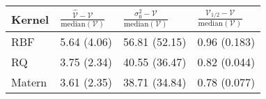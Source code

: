 \begin{tabular}{llll}
  \toprule
Kernel & $\frac{\hat{\mathcal{V}} - \mathcal{V}}{\mathrm{median}(\mathcal{V})}$ & $\frac{\sigma_0^2 - \mathcal{V}}{\mathrm{median}(\mathcal{V})}$ & $\frac{\mathcal{V}_{1/2} - \mathcal{V}}{\mathrm{median}(\mathcal{V})}$ \\ 
  \midrule
RBF & 5.64 (4.06) & 56.81 (52.15) & 0.96 (0.183) \\ 
  RQ & 3.75 (2.34) & 40.55 (36.47) & 0.82 (0.044) \\ 
  Matern & 3.61 (2.35) & 38.71 (34.84) & 0.78 (0.077) \\ 
   \bottomrule
\end{tabular}
